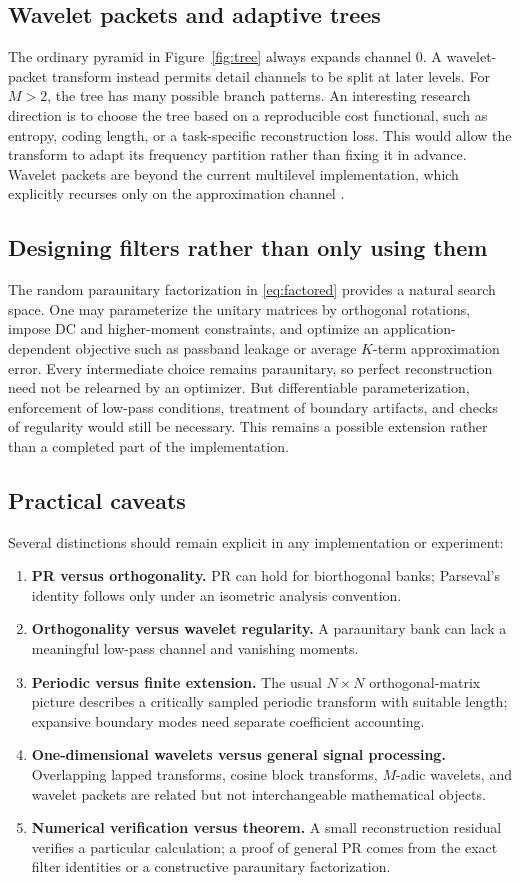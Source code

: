 \documentclass{article}
\theoremstyle{definition}
\theoremstyle{remark}
\begin{document}
\subsection{Wavelet packets and adaptive trees}
The ordinary pyramid in Figure~\ref{fig:tree} always expands channel $0$. A wavelet-packet transform instead permits detail channels to be split at later levels. For $M>2$, the tree has many possible branch patterns. An interesting research direction is to choose the tree based on a reproducible cost functional, such as entropy, coding length, or a task-specific reconstruction loss. This would allow the transform to adapt its frequency partition rather than fixing it in advance. Wavelet packets are beyond the current multilevel implementation, which explicitly recurses only on the approximation channel \cite{su2026}.

\subsection{Designing filters rather than only using them}
The random paraunitary factorization in \eqref{eq:factored} provides a natural search space. One may parameterize the unitary matrices by orthogonal rotations, impose DC and higher-moment constraints, and optimize an application-dependent objective such as passband leakage or average $K$-term approximation error. Every intermediate choice remains paraunitary, so perfect reconstruction need not be relearned by an optimizer. But differentiable parameterization, enforcement of low-pass conditions, treatment of boundary artifacts, and checks of regularity would still be necessary. This remains a possible extension rather than a completed part of the implementation.

\subsection{Practical caveats}
Several distinctions should remain explicit in any implementation or experiment:
\begin{enumerate}
\item \textbf{PR versus orthogonality.} PR can hold for biorthogonal banks; Parseval's identity follows only under an isometric analysis convention.
\item \textbf{Orthogonality versus wavelet regularity.} A paraunitary bank can lack a meaningful low-pass channel and vanishing moments.
\item \textbf{Periodic versus finite extension.} The usual $N\times N$ orthogonal-matrix picture describes a critically sampled periodic transform with suitable length; expansive boundary modes need separate coefficient accounting.
\item \textbf{One-dimensional wavelets versus general signal processing.} Overlapping lapped transforms, cosine block transforms, $M$-adic wavelets, and wavelet packets are related but not interchangeable mathematical objects.
\item \textbf{Numerical verification versus theorem.} A small reconstruction residual verifies a particular calculation; a proof of general PR comes from the exact filter identities or a constructive paraunitary factorization.
\end{enumerate}
\end{document}
